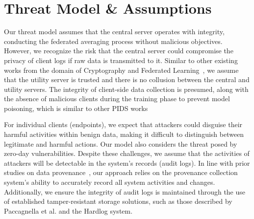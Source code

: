 
\section{Threat Model \& Assumptions}



Our threat model assumes that the central server operates with integrity, conducting the federated averaging process without malicious objectives. However, we recognize the risk that the central server could compromise the privacy of client logs if raw data is transmitted to it. Similar to other existing works from the domain of Cryptography and Federated Learning~\cite{roy2020crypte,wu2022federated},  we assume that the utility server is trusted and there is no collusion between the central and utility servers. The integrity of client-side data collection is presumed, along with the absence of malicious clients during the training phase to prevent model poisoning, which is similar to other PIDS works~\cite{cheng2023kairos,flash2024,yangprographer,wang2022threatrace,provdetector2020}

For individual clients (endpoints), we expect that attackers could disguise their harmful activities within benign data, making it difficult to distinguish between legitimate and harmful actions. Our model also considers the threat posed by zero-day vulnerabilities. Despite these challenges, we assume that the activities of attackers will be detectable in the system's records (audit logs). In line with prior studies on data provenance~\cite{nodoze2019, priotracker2018, mzx2016, bates2017transparent,omegalog,rapsheet2020,provthings2018,dossier,inam2023sok,poirot2019}, our approach relies on the provenance collection system's ability to accurately record all system activities and changes. Additionally, we ensure the integrity of audit logs is maintained through the use of established tamper-resistant storage solutions, such as those described by Paccagnella et al.\cite{paccagnella2020custos} and the Hardlog system\cite{hardlog}.


